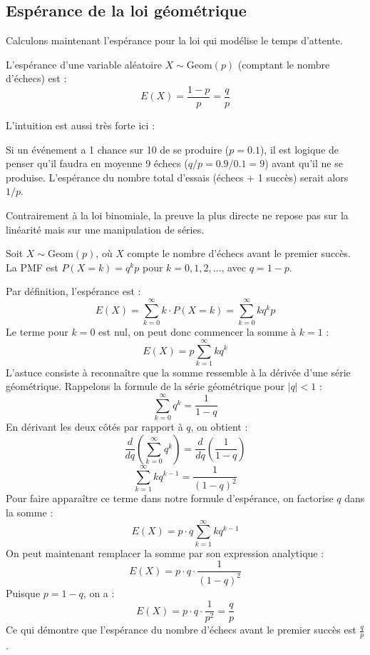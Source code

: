 \subsection{Espérance de la loi géométrique}

Calculons maintenant l'espérance pour la loi qui modélise le temps d'attente.

\begin{theorembox}
L'espérance d'une variable aléatoire $X \sim \text{Geom}(p)$ (comptant le nombre d'échecs) est :
$$ E(X) = \frac{1-p}{p} = \frac{q}{p} $$
\end{theorembox}

L'intuition est aussi très forte ici :

\begin{intuitionbox}
Si un événement a 1 chance sur 10 de se produire ($p=0.1$), il est logique de penser qu'il faudra en moyenne 9 échecs ($q/p = 0.9/0.1=9$) avant qu'il ne se produise. L'espérance du nombre total d'essais (échecs + 1 succès) serait alors $1/p$.
\end{intuitionbox}

Contrairement à la loi binomiale, la preuve la plus directe ne repose pas sur la linéarité mais sur une manipulation de séries.

\begin{proofbox}
Soit $X \sim \text{Geom}(p)$, où $X$ compte le nombre d'échecs avant le premier succès. La PMF est $P(X=k) = q^k p$ pour $k=0, 1, 2, \dots$, avec $q=1-p$.

Par définition, l'espérance est :
$$ E(X) = \sum_{k=0}^{\infty} k \cdot P(X=k) = \sum_{k=0}^{\infty} k q^k p $$
Le terme pour $k=0$ est nul, on peut donc commencer la somme à $k=1$ :
$$ E(X) = p \sum_{k=1}^{\infty} k q^k $$
L'astuce consiste à reconnaître que la somme ressemble à la dérivée d'une série géométrique. Rappelons la formule de la série géométrique pour $|q|<1$ :
$$ \sum_{k=0}^{\infty} q^k = \frac{1}{1-q} $$
En dérivant les deux côtés par rapport à $q$, on obtient :
$$ \frac{d}{dq} \left( \sum_{k=0}^{\infty} q^k \right) = \frac{d}{dq} \left( \frac{1}{1-q} \right) $$
$$ \sum_{k=1}^{\infty} k q^{k-1} = \frac{1}{(1-q)^2} $$
Pour faire apparaître ce terme dans notre formule d'espérance, on factorise $q$ dans la somme :
$$ E(X) = p \cdot q \sum_{k=1}^{\infty} k q^{k-1} $$
On peut maintenant remplacer la somme par son expression analytique :
$$ E(X) = p \cdot q \cdot \frac{1}{(1-q)^2} $$
Puisque $p = 1-q$, on a :
$$ E(X) = p \cdot q \cdot \frac{1}{p^2} = \frac{q}{p} $$
Ce qui démontre que l'espérance du nombre d'échecs avant le premier succès est $\frac{q}{p}$.
\end{proofbox}

